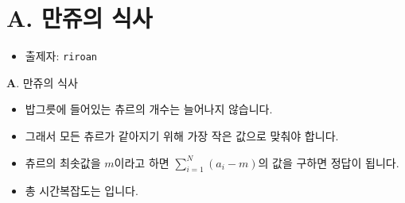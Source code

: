 \section{A. 만쥬의 식사}

\begin{frame} %
    \begin{itemize}
        \item 출제자: \texttt{riroan}
    \end{itemize}
\end{frame}

\begin{frame}{\textbf{A}. 만쥬의 식사}
    \begin{itemize}
        \item 밥그릇에 들어있는 츄르의 개수는 늘어나지 않습니다.
        \item 그래서 모든 츄르가 같아지기 위해 가장 작은 값으로 맞춰야 합니다.
        \item 츄르의 최솟값을 $m$이라고 하면 $\sum_{i=1}^N (a_i - m)$의 값을 구하면 정답이 됩니다.
		\item 총 시간복잡도는 입니다.
    \end{itemize}
\end{frame}